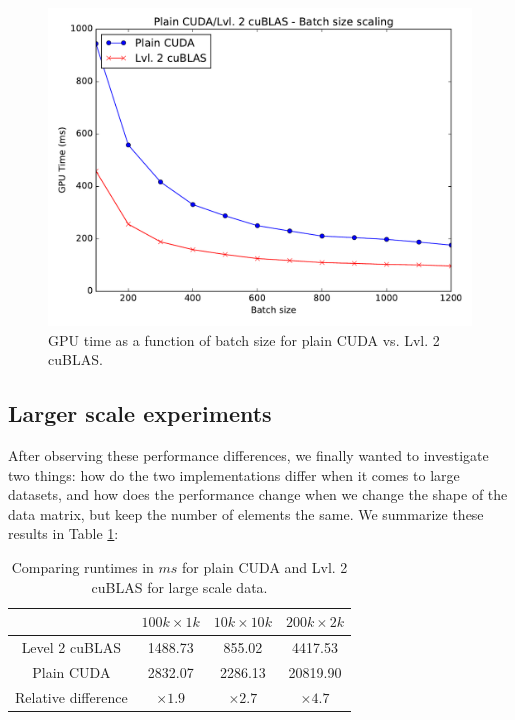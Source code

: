 \documentclass[11pt,a4paper]{article}
\begin{document}
\begin{figure}[H]
	\centering
	\includegraphics[width=0.8\linewidth]{gpu_plain_vs_Lvl2cuBLAS-100b-1200b.pdf}
	\caption{GPU time as a function of batch size for plain CUDA  vs. Lvl. 2 cuBLAS.}
	\label{fig:plain-cublas-batch-size}
\end{figure}

\subsection{Larger scale experiments}

After observing these performance differences, we finally wanted to investigate two things:
how do the two implementations differ when it comes to large datasets, and how does the
performance change when we change the shape of the data matrix, but keep the number of elements
the same. We summarize these results in Table \ref{table:large-scale-runtimes}:

\begin{table}[h]
	\centering
	\begin{tabular}{|c|c|c|c|}
		\hline  & $100k \times 1k$ & $10k \times 10k$ & $200k \times 2k$ \\ 
		\hline Level 2 cuBLAS & 1488.73 & 855.02 & 4417.53 \\ 
		\hline Plain CUDA & 2832.07 & 2286.13 & 20819.90\\ 
		\hline Relative difference & $\mathbf{\times1.9}$ & $\mathbf{\times2.7}$ & $\mathbf{\times4.7}$\\ 
		\hline 
	\end{tabular} 
	\caption{Comparing runtimes in $ms$ for plain CUDA and Lvl. 2 cuBLAS for large scale data.}
	\label{table:large-scale-runtimes}
\end{table}
\end{document}
